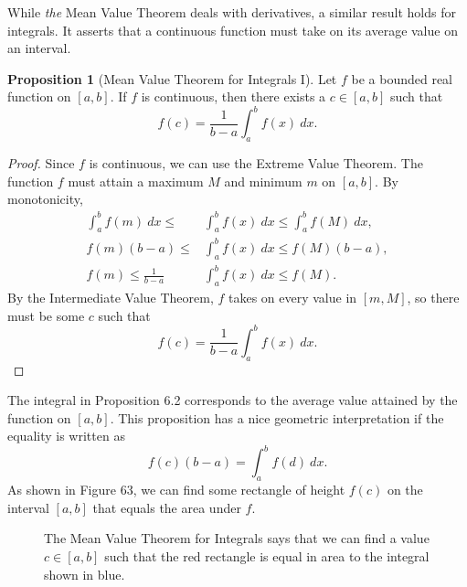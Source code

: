 \documentclass{article}
\newcommand{\R}{\mathbb{R}}
\theoremstyle{definition}
\newtheorem{proposition}{Proposition}[section]
\begin{document}
	While \textit{the } Mean Value Theorem deals with derivatives, a similar result holds for integrals. It asserts that a continuous function must take on its average value on an interval.
	\begin{proposition}[Mean Value Theorem for Integrals I]
		Let $ f $ be a bounded real function on $ [a,b] $. If $ f $ is continuous, then there exists a $ c\in[a,b] $ such that $$f(c)=\frac{1}{b-a}\int_{a}^{b}f(x)\ dx.$$	
	\end{proposition}
	\begin{proof}
		Since $ f $ is continuous, we can use the Extreme Value Theorem. The function $ f $ must attain a maximum $ M $ and minimum $ m $ on $ [a,b] $. By monotonicity, 
		\begin{align*}
			\int_{a}^{b}f(m)\ dx\le &\int_{a}^{b}f(x)\ dx\le \int_{a}^{b}f(M)\ dx,\\
			f(m)(b-a)\le &\int_{a}^{b}f(x)\ dx\le f(M)(b-a),\\
			f(m)\le \frac{1}{b-a}&\int_{a}^{b}f(x)\ dx\le f(M).
		\end{align*}
		By the Intermediate Value Theorem, $ f $ takes on every value in $ [m,M] $, so there must be some $ c $ such that $$f(c)=\frac{1}{b-a}\int_{a}^{b}f(x)\ dx.$$
	\end{proof}
	The integral in Proposition 6.2 corresponds to the average value attained by the function on $ [a,b] $. This proposition has a nice geometric interpretation if the equality is written as $$ f(c)(b-a)=\int_{a}^{b}f(d)\ dx.$$ As shown in Figure 63, we can find some rectangle of height $ f(c) $ on the interval $ [a,b] $ that equals the area under $ f $. 
	\begin{figure}[h!]
		\centering
		\caption{ The Mean Value Theorem for Integrals says that we can find a value $ c\in[a,b] $ such that the red rectangle is equal in area to the integral shown in blue.}
	\end{figure}
\end{document}
